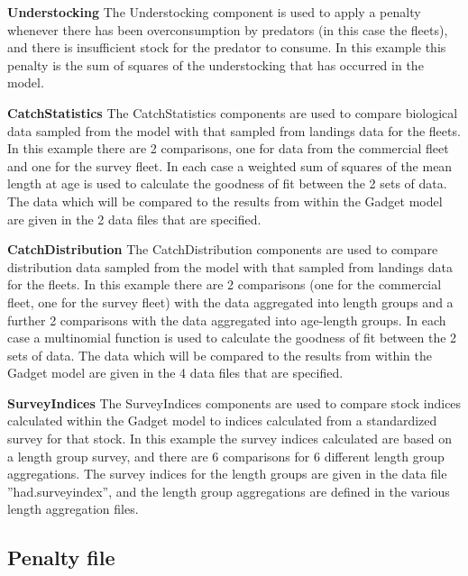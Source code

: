 \documentclass[10pt,titlepage]{article}
\begin{document}
\bigskip
{\bf Understocking}\newline
The Understocking component is used to apply a penalty whenever there has been overconsumption by predators (in this case the fleets), and there is insufficient stock for the predator to consume.  In this example this penalty is the sum of squares of the understocking that has occurred in the model.

\bigskip
{\bf CatchStatistics}\newline
The CatchStatistics components are used to compare biological data sampled from the model with that sampled from landings data for the fleets.  In this example there are 2 comparisons, one for data from the commercial fleet and one for the survey fleet.  In each case a weighted sum of squares of the mean length at age is used to calculate the goodness of fit between the 2 sets of data.  The data which will be compared to the results from within the Gadget model are given in the 2 data files that are specified.

\bigskip
{\bf CatchDistribution}\newline
The CatchDistribution components are used to compare distribution data sampled from the model with that sampled from landings data for the fleets.  In this example there are 2 comparisons (one for the commercial fleet, one for the survey fleet) with the data aggregated into length groups and a further 2 comparisons with the data aggregated into age-length groups.  In each case a multinomial function is used to calculate the goodness of fit between the 2 sets of data.  The data which will be compared to the results from within the Gadget model are given in the 4 data files that are specified.

\bigskip
{\bf SurveyIndices}\newline
The SurveyIndices components are used to compare stock indices calculated within the Gadget model to indices calculated from a standardized survey for that stock.  In this example the survey indices calculated are based on a length group survey, and there are 6 comparisons for 6 different length group aggregations.  The survey indices for the length groups are given in the data file ''had.surveyindex'', and the length group aggregations are defined in the various length aggregation files.

{\small }

\subsection{Penalty file}
\end{document}
